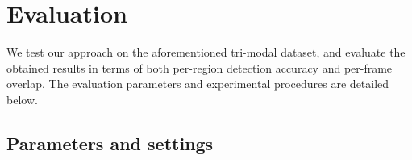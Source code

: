\documentclass[10pt,twocolumn,letterpaper]{article}
\begin{document}
%
%
%


\section{Evaluation}
\label{sec:evaluation}
We test our approach on the aforementioned tri-modal dataset, and evaluate the obtained results in terms of both per-region detection accuracy and per-frame overlap. The evaluation parameters and experimental procedures are detailed below. 

\subsection{Parameters and settings}
\label{ssec:parametersandsettings}
\end{document}

